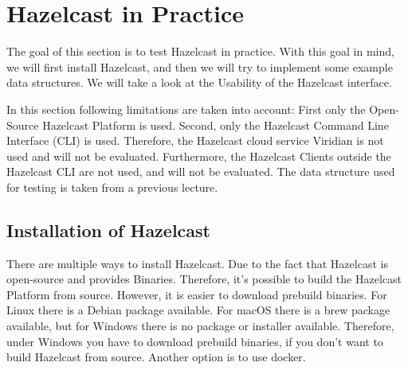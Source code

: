 
\section{Hazelcast in Practice}
The goal of this section is to test Hazelcast in practice. With this goal in
mind, we will first install Hazelcast, and then we will try to implement some
example data structures. We will take a look at the Usability of the Hazelcast
interface. 

In this section following limitations are taken into account: First only the
Open-Source Hazelcast Platform is used. Second, only the Hazelcast Command Line
Interface (CLI) is used. Therefore, the Hazelcast cloud service Viridian is not
used and will not be evaluated. Furthermore, the Hazelcast Clients outside
the Hazelcast CLI are not used, and will not be evaluated. The data structure
used for testing is taken from a previous lecture.
\todo{}
\subsection{Installation of Hazelcast}
There are multiple ways to install Hazelcast. Due to the fact that Hazelcast is
open-source and provides Binaries. Therefore, it's possible to build the
Hazelcast Platform from source. However, it is easier to download prebuild
binaries. For Linux there is a Debian package available. For macOS there is a
brew package available, but for Windows there is no package or installer
available. Therefore, under Windows you have to download prebuild binaries,
if you don't want to build Hazelcast from source. Another option is to use
docker. \parencite{hazelcast_installing_nodate}

